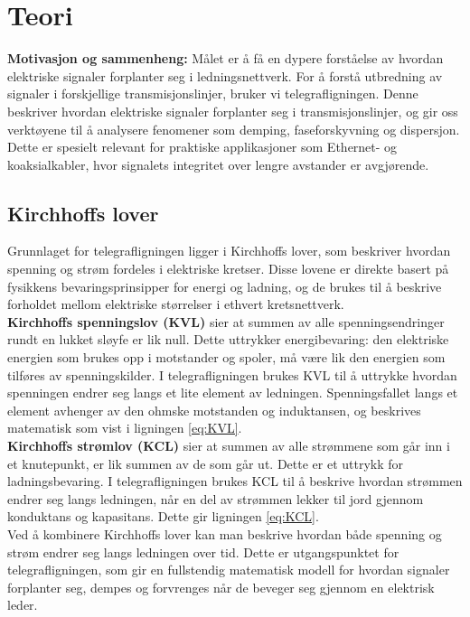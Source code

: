 
\section{Teori}

    \textbf{Motivasjon og sammenheng:} Målet er å få en dypere forståelse av hvordan elektriske signaler forplanter seg i ledningsnettverk. For å forstå utbredning av signaler i forskjellige transmisjonslinjer, bruker vi telegrafligningen. Denne beskriver hvordan elektriske signaler forplanter seg i transmisjonslinjer, og gir oss verktøyene til å analysere fenomener som demping, faseforskyvning og dispersjon. Dette er spesielt relevant for praktiske applikasjoner som Ethernet- og koaksialkabler, hvor signalets integritet over lengre avstander er avgjørende.

\subsection{Kirchhoffs lover}

Grunnlaget for telegrafligningen ligger i Kirchhoffs lover, som beskriver hvordan spenning og strøm 
fordeles i elektriske kretser. Disse lovene er direkte basert på fysikkens bevaringsprinsipper 
for energi og ladning, og de brukes til å beskrive forholdet mellom elektriske størrelser i ethvert 
kretsnettverk.
\\[1em]
\textbf{Kirchhoffs spenningslov (KVL)} sier at summen av alle spenningsendringer rundt en lukket 
sløyfe er lik null. Dette uttrykker energibevaring: den elektriske energien som brukes opp i motstander 
og spoler, må være lik den energien som tilføres av spenningskilder. I telegrafligningen brukes KVL 
til å uttrykke hvordan spenningen endrer seg langs et lite element av ledningen. Spenningsfallet 
langs et element avhenger av den ohmske motstanden og induktansen, og beskrives matematisk som vist i ligningen \eqref{eq:KVL}.
\\[1em]
\textbf{Kirchhoffs strømlov (KCL)} sier at summen av alle strømmene som går inn i et knutepunkt, 
er lik summen av de som går ut. Dette er et uttrykk for ladningsbevaring. I telegrafligningen brukes 
KCL til å beskrive hvordan strømmen endrer seg langs ledningen, når en del av strømmen lekker til jord 
gjennom konduktans og kapasitans. Dette gir ligningen \eqref{eq:KCL}.\\[1em]
Ved å kombinere Kirchhoffs lover kan man beskrive hvordan både spenning og strøm endrer seg 
langs ledningen over tid. Dette er utgangspunktet for telegrafligningen, som gir 
en fullstendig matematisk modell for hvordan signaler forplanter seg, dempes og forvrenges når de beveger 
seg gjennom en elektrisk leder.

